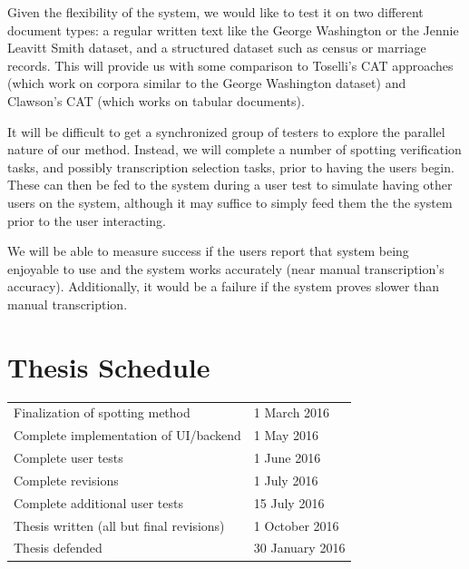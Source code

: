 \documentclass[ms]{byuprop}
\begin{document}
Given the flexibility of the system, we would like to test it on two different document types: a regular written text like the George Washington\cite{GW} or the Jennie Leavitt Smith\cite{Smith} dataset, and a structured dataset such as census or marriage records. This will provide us with some comparison to Toselli's CAT approaches (which work on corpora similar to the George Washington dataset) and Clawson's CAT (which works on tabular documents).

It will be difficult to get a synchronized group of testers to explore the parallel nature of our method. Instead, we will complete a number of spotting verification tasks, and possibly transcription selection tasks, prior to having the users begin. These can then be fed to the system during a user test to simulate having other users on the system, although it may suffice to simply feed them the the system prior to the user interacting.

We will be able to measure success if the users report that system being enjoyable to use and the system works accurately (near manual transcription's accuracy). Additionally, it would be a failure if the system proves slower than manual transcription.


\section{Thesis Schedule}
\begin{table}[H]
\centering
\begin{tabular}{ll}
Finalization of spotting method          & 1 March 2016 \\
Complete implementation of UI/backend    & 1 May 2016    \\
Complete user tests                      & 1 June 2016   \\
Complete revisions                       & 1 July 2016      \\
Complete additional user tests           & 15 July 2016     \\
Thesis written (all but final revisions) & 1 October 2016     \\
Thesis defended                          & 30 January 2016    
\end{tabular}
\end{table}




\end{document}
